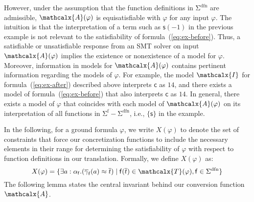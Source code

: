 \documentclass[runningheads,a4paper]{llncs}
\newcommand{\con}[1]{\mathsf{#1}}
\renewcommand\vec[1]{\overline{#1}}
\let\oldSigma=\Sigma
\def\Sigma{\mathrm{\oldSigma}}
\newcommand{\teq}{\approx}
\newcommand{\terms}{\mathcalx{T}}
\newcommand{\I}{\mathcalx{I}}
\newcommand{\conv}{\mathcalx{A}}
\newcommand{\sfuns}[1]{#1^\mathrm{f}}
\newcommand{\sfundefs}[1]{#1^\mathrm{dfn}}
\newcommand\concret{\gamma} %
\newcommand{\vecfarg}[1]{\vec{\concret}_{#1}}
\newcommand{\fargtype}[1]{\alpha_{#1}}
\newcommand{\rem}[1]{\textcolor{red}{[#1]}}
\newcommand{\jb}[1]{\rem{#1 --jb}}
\newcommand{\ct}[1]{\rem{#1 --ct}}
\newcommand{\absconstraints}{X}
\begin{document}
However, under the assumption that the function definitions in
$\sfundefs{\Sigma}$ are admissible, %
$\conv(\varphi)$ is equisatisfiable with $\varphi$ for any input $\varphi$.
The intuition is that the
interpretation of a term such as $\con{s}( -1 )$ in the previous example is not
relevant to the satisfiability of formula~(\ref{eq:ex-before}). Thus, a
satisfiable or unsatisfiable response from an SMT solver on input $\conv(
\varphi )$ implies the existence or nonexistence of a model for
$\varphi$. Moreover, information in models for $\conv( \varphi )$ contains
pertinent information regarding the models of $\varphi$. For example, the model
$\I$ for formula~(\ref{eq:ex-after}) described above interprets $\con{c}$ as $14$,
and there exists a model of formula~(\ref{eq:ex-before}) that also interprets $\con{c}$
as $14$. In general, there exists a model of $\varphi$ that
coincides with each model of $\conv( \varphi )$ on its interpretation of all
functions in $\sfuns{\Sigma} - \sfundefs{\Sigma}$, i.e., $\{
\con{s} \}$ in the example.


In the following, for a ground formula $\varphi$, 
we write $\absconstraints( \varphi )$ to denote the set of constraints 
that force our concretization functions to include the necessary elements in their range
for determining the satisfiability of $\varphi$ with respect to function definitions in our translation.
Formally, we define $\absconstraints( \varphi )$ as:
\[
\absconstraints( \varphi ) = \{ \exists a : {\fargtype{\con{f}}}. ( \vecfarg{\con{f}}( a ) \teq \vec t ) \mid \con{f}( \vec t ) \in \terms( \varphi ), \con{f} \in \sfundefs{\Sigma} \}
\]
The following lemma states the central invariant behind our conversion function $\conv$.
\end{document}
